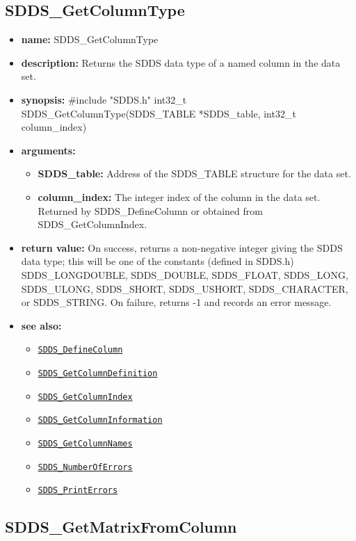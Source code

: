 \documentclass[11pt]{article}
\newcommand{\progref}[1]{\hyperref[SDDS_#1]{\tt SDDS\_#1}}
\begin{document}
\subsection{SDDS\_GetColumnType}
\label{SDDS_GetColumnType}

\begin{itemize}
\item {\bf name:}\newline
SDDS\_GetColumnType
\item {\bf description:}\newline
Returns the SDDS data type of a named column in the data set.
\item {\bf synopsis:} \#include "SDDS.h"\newline
int32\_t SDDS\_GetColumnType(SDDS\_TABLE *SDDS\_table, int32\_t column\_index)
\item {\bf arguments:}
\begin{itemize}
\item {\bf SDDS\_table:} Address of the SDDS\_TABLE structure for the data set.
\item {\bf column\_index:} The integer index of the column in the data set. Returned by SDDS\_DefineColumn or obtained from SDDS\_GetColumnIndex.
\end{itemize}
\item {\bf return value:}\newline
On success, returns a non-negative integer giving the SDDS data type; this will be one of the constants (defined in SDDS.h) SDDS\_LONGDOUBLE, SDDS\_DOUBLE, SDDS\_FLOAT, SDDS\_LONG, SDDS\_ULONG, SDDS\_SHORT, SDDS\_USHORT, SDDS\_CHARACTER, or SDDS\_STRING. On failure, returns -1 and records an error message.
\item {\bf see also:}
\begin{itemize}
\item \progref{DefineColumn}
\item \progref{GetColumnDefinition}
\item \progref{GetColumnIndex}
\item \progref{GetColumnInformation}
\item \progref{GetColumnNames}
\item \progref{NumberOfErrors}
\item \progref{PrintErrors}
\end{itemize}
\end{itemize}

\subsection{SDDS\_GetMatrixFromColumn}
\label{SDDS_GetMatrixFromColumn}
\end{document}
